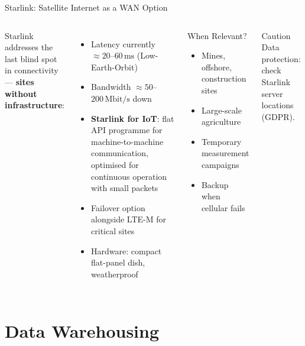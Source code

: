 \documentclass[aspectratio=169]{beamer}
\begin{document}
\begin{frame}{Starlink: Satellite Internet as a WAN Option}
  \begin{columns}
      Starlink addresses the last blind spot in connectivity — \textbf{sites without infrastructure}:
      \begin{itemize}
        \item Latency currently $\approx 20$–$60\,\text{ms}$ (Low-Earth-Orbit)
        \item Bandwidth $\approx 50$–$200\,\text{Mbit/s}$ down
        \item \textbf{Starlink for IoT}: flat API programme for
              machine-to-machine communication, optimised for
              continuous operation with small packets
        \item Failover option alongside LTE-M for critical sites
        \item Hardware: compact flat-panel dish, weatherproof
      \end{itemize}
      \begin{block}{When Relevant?}
        \begin{itemize}
          \item Mines, offshore, construction sites
          \item Large-scale agriculture
          \item Temporary measurement campaigns
          \item Backup when cellular fails
        \end{itemize}
      \end{block}
      \begin{alertblock}{Caution}
        Data protection: check Starlink server locations (GDPR).
      \end{alertblock}
  \end{columns}
\end{frame}

\section{Data Warehousing}
\end{document}
